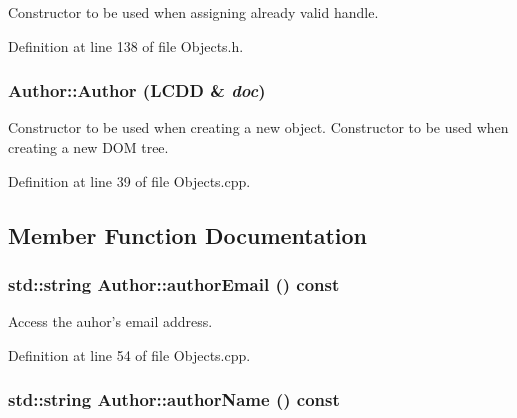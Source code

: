 Constructor to be used when assigning already valid handle. 

Definition at line 138 of file Objects.h.\hypertarget{class_d_d4hep_1_1_geometry_1_1_author_a9b8aae7585fe19fce420630f7fdd0d55}{
\subsubsection[{Author}]{\setlength{\rightskip}{0pt plus 5cm}Author::Author ({\bf LCDD} \& {\em doc})}}
\label{class_d_d4hep_1_1_geometry_1_1_author_a9b8aae7585fe19fce420630f7fdd0d55}


Constructor to be used when creating a new object. Constructor to be used when creating a new DOM tree. 

Definition at line 39 of file Objects.cpp.

\subsection{Member Function Documentation}
\hypertarget{class_d_d4hep_1_1_geometry_1_1_author_a00e4790124ad6e3e3fe6db864629e9f9}{
\subsubsection[{authorEmail}]{\setlength{\rightskip}{0pt plus 5cm}std::string Author::authorEmail () const}}
\label{class_d_d4hep_1_1_geometry_1_1_author_a00e4790124ad6e3e3fe6db864629e9f9}


Access the auhor's email address. 

Definition at line 54 of file Objects.cpp.\hypertarget{class_d_d4hep_1_1_geometry_1_1_author_afd39c0164d6dc9322fba81f4718c1b16}{
\subsubsection[{authorName}]{\setlength{\rightskip}{0pt plus 5cm}std::string Author::authorName () const}}
\label{class_d_d4hep_1_1_geometry_1_1_author_afd39c0164d6dc9322fba81f4718c1b16}


